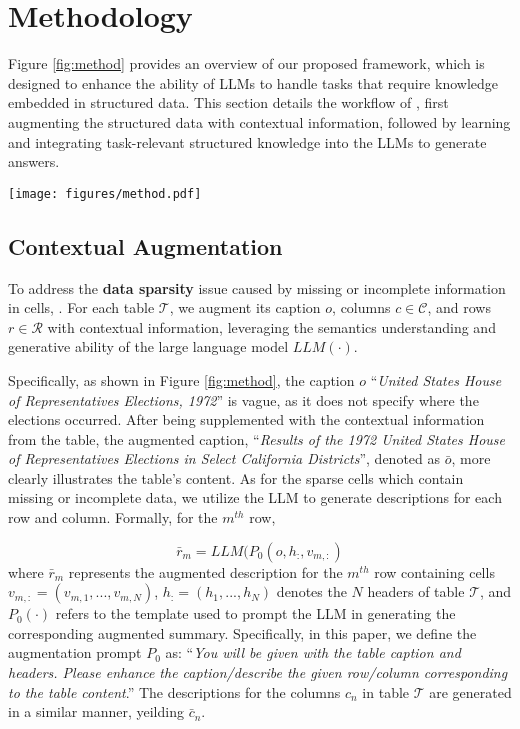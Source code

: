 \section{Methodology}
Figure \ref{fig:method} provides an overview of our proposed \name framework, which is designed to enhance the ability of LLMs to handle tasks that require knowledge embedded in structured data.  This section details the workflow of \name, first augmenting the structured data with contextual information, followed by learning and integrating task-relevant structured knowledge into the LLMs to generate answers.

\begin{figure*}[htbp]
    \centering
    \texttt{[image: figures/method.pdf]}
    \caption{An overview of our proprosed \name framework.}
    \label{fig:method}
\end{figure*}

\subsection{Contextual Augmentation}
To address the \textbf{data sparsity} issue caused by missing or incomplete information in cells, . For each table $\mathcal{T}$, we augment its caption $o$, columns $c\in\mathcal{C}$, and rows $r\in\mathcal{R}$ with contextual information, leveraging the semantics understanding and generative ability of the large language model $LLM(\cdot)$. 

Specifically, as shown in Figure \ref{fig:method}, the caption $o$ ``\textit{United States House of Representatives Elections, 1972}'' is vague, as it does not specify where the elections occurred. After being supplemented with the contextual information from the table, the augmented caption, ``\textit{Results of the 1972 United States House of Representatives Elections in Select California Districts}'', denoted as $\bar{o}$, more clearly illustrates the table's content. As for the sparse cells which contain missing or incomplete data, we utilize the LLM to generate descriptions for each row and column. Formally, for the $m^{th}$ row,

\begin{equation}
        \bar{r}_m = LLM(P_0(o, h_{:}, v_{m,:})
\label{eq:augmented}
\end{equation}
where $\bar{r}_m$ represents the augmented description for the $m^{th}$ row containing cells $v_{m,:}=(v_{m,1}, ..., v_{m,N})$, $h_{:}=(h_1, ..., h_N)$ denotes the $N$ headers of table $\mathcal{T}$, and $P_0(\cdot)$ refers to the template used to prompt the LLM in generating the corresponding augmented summary. Specifically, in this paper, we define the augmentation prompt $P_0$ as: ``\textit{You will be given with the table caption and headers. Please enhance the caption/describe the given row/column corresponding to the table content}.'' The descriptions for the columns $c_n$ in table $\mathcal{T}$ are generated in a similar manner, yeilding $\bar{c}_n$. 

